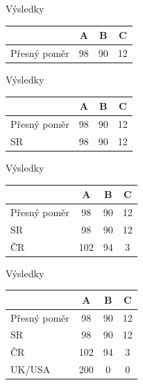 \documentclass[17pt]{beamer}
\begin{document}
\begin{frame}{Výsledky}
\begin{center}
\begin{tabular}{|l|c|c|c|} \hline
  & A & B & C \\ \hline 
Přesný poměr & 98 & 90 & 12\\ \hline
\end{tabular}
\end{center} 
\end{frame}

\begin{frame}{Výsledky}
\begin{center}
\begin{tabular}{|l|c|c|c|} \hline
  & A & B & C \\ \hline 
Přesný poměr & 98 & 90 & 12\\ \hline
SR & 98 & 90 & 12\\ \hline
\end{tabular}
\end{center} 
\end{frame}

\begin{frame}{Výsledky}
\begin{center}
\begin{tabular}{|l|c|c|c|} \hline
  & A & B & C \\ \hline 
Přesný poměr & 98 & 90 & 12\\ \hline
SR & 98 & 90 & 12\\ \hline
ČR & 102 & 94 & 3\\ \hline
\end{tabular}
\end{center} 
\end{frame}

\begin{frame}{Výsledky}
\begin{center}
\begin{tabular}{|l|c|c|c|} \hline
  & A & B & C \\ \hline 
Přesný poměr & 98 & 90 & 12\\ \hline
SR & 98 & 90 & 12\\ \hline
ČR & 102 & 94 & 3\\ \hline
UK/USA & 200 & 0 & 0\\ \hline
\end{tabular}
\end{center} 
\end{frame}
\end{document}
